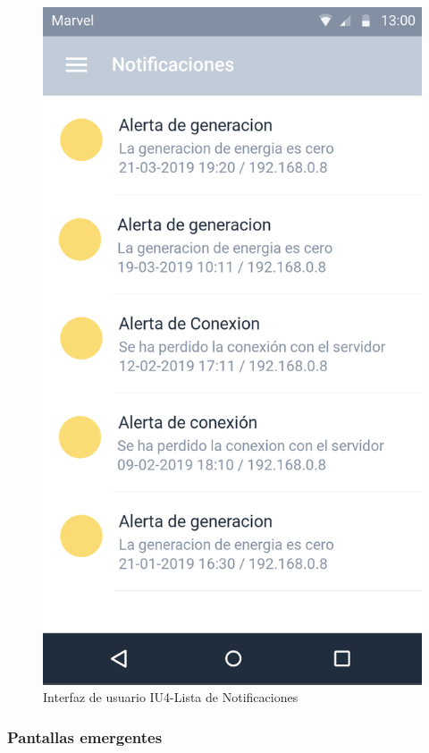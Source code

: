 \begin{figure}[H]
	\centering
	\includegraphics[scale=0.70]{Capitulo4/software/submodulos/images/notificaciones.png}
	\caption{Interfaz de usuario IU4-Lista de Notificaciones}
	\label{fig:Lista de Notificaciones}
\end{figure}


\subsubsection{Pantallas emergentes}\label{Pantallas Emergentes}

